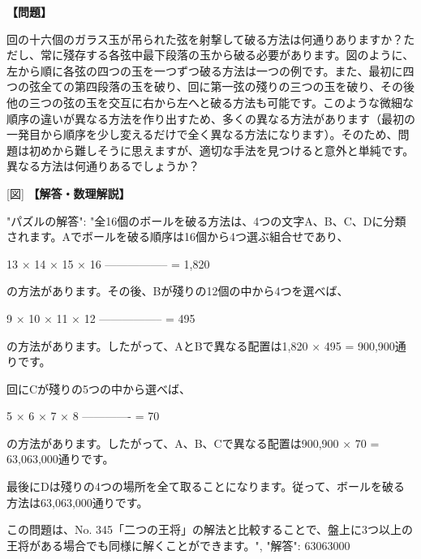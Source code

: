 \documentclass[10pt,a4paper,oneside,openany]{ltjsbook}
\begin{document}
\begin{tcolorbox}[colback=softblue,colframe=primaryblue,title=\textbf{第 270 問：THE GLASS BALLS.},arc=2mm,boxrule=1pt,breakable]
\textbf{【問題】}\par\vspace{0.3em}
回の十六個のガラス玉が吊られた弦を射撃して破る方法は何通りありますか？ただし、常に殘存する各弦中最下段落の玉から破る必要があります。図のように、左から順に各弦の四つの玉を一つずつ破る方法は一つの例です。また、最初に四つの弦全ての第四段落の玉を破り、回に第一弦の殘りの三つの玉を破り、その後他の三つの弦の玉を交互に右から左へと破る方法も可能です。このような微細な順序の違いが異なる方法を作り出すため、多くの異なる方法があります（最初の一発目から順序を少し変えるだけで全く異なる方法になります）。そのため、問題は初めから難しそうに思えますが、適切な手法を見つけると意外と単純です。異なる方法は何通りあるでしょうか？

[図]
\tcblower
\textbf{【解答・数理解説】}\par\vspace{0.3em}
{
    "パズルの解答": "全16個のボールを破る方法は、4つの文字A、B、C、Dに分類されます。Aでボールを破る順序は16個から4つ選ぶ組合せであり、

    13 × 14 × 15 × 16
    ----------------- = 1,820

の方法があります。その後、Bが殘りの12個の中から4つを選べば、

     9 × 10 × 11 × 12
    ----------------- = 495

の方法があります。したがって、AとBで異なる配置は1,820 × 495 = 900,900通りです。

回にCが殘りの5つの中から選べば、

    5 × 6 × 7 × 8
    ------------- = 70

の方法があります。したがって、A、B、Cで異なる配置は900,900 × 70 = 63,063,000通りです。

最後にDは殘りの4つの場所を全て取ることになります。従って、ボールを破る方法は63,063,000通りです。

この問題は、No. 345「二つの王将」の解法と比較することで、盤上に3つ以上の王将がある場合でも同様に解くことができます。",
    "解答": 63063000
}
\end{tcolorbox}
\end{document}
